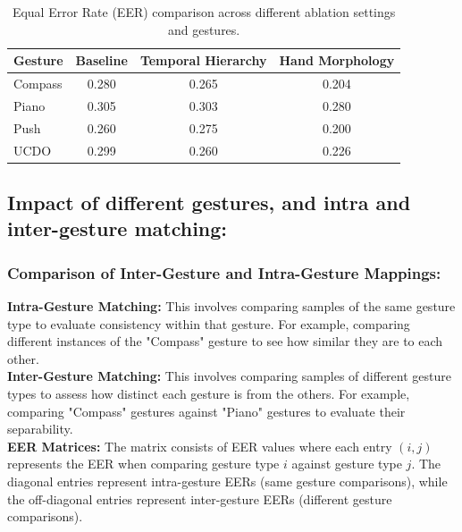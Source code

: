 \begin{table}[H]
    \centering
    \caption{Equal Error Rate (EER) comparison across different ablation settings and gestures.}
    \label{tab:ablation_eer}
    \begin{tabular}{lccc}
        \hline
        \textbf{Gesture} & \textbf{Baseline} & \textbf{Temporal Hierarchy} & \textbf{Hand Morphology} \\
        \hline
        Compass & 0.280 & 0.265 & 0.204 \\
        Piano   & 0.305 & 0.303 & 0.280 \\
        Push    & 0.260 & 0.275 & 0.200 \\
        UCDO    & 0.299 & 0.260 & 0.226 \\
        \hline
    \end{tabular}
\end{table}


\subsection{Impact of different gestures, and intra and inter-gesture matching:}


\subsubsection{Comparison of Inter-Gesture and Intra-Gesture Mappings:}
\textbf{Intra-Gesture Matching:} This involves comparing samples of the same gesture type to evaluate consistency within that gesture. For example, comparing different instances of the "Compass" gesture to see how similar they are to each other.\\
\textbf{Inter-Gesture Matching:} This involves comparing samples of different gesture types to assess how distinct each gesture is from the others. For example, comparing "Compass" gestures against "Piano" gestures to evaluate their separability.\\
\textbf{EER Matrices:} The matrix consists of EER values where each entry $(i, j)$ represents the EER when comparing gesture type $i$ against gesture type $j$. The diagonal entries represent intra-gesture EERs (same gesture comparisons), while the off-diagonal entries represent inter-gesture EERs (different gesture comparisons).\\


